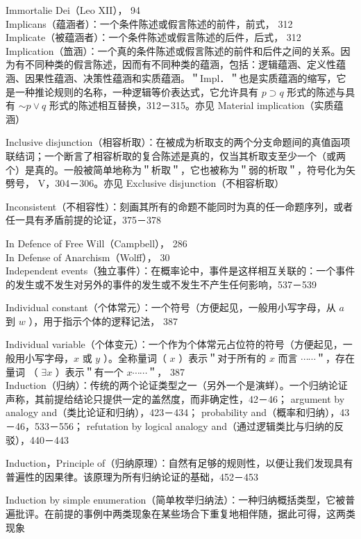 Immortalie Dei（Leo XII）， 94\\
Implicans（蕴涵者）：一个条件陈述或假言陈述的前件，前式， 312\\
Implicate（被蕴涵者）：一个条件陈述或假言陈述的后件，后式， 312\\
Implication（笽涵）：一个真的条件陈述或假言陈述的前件和后件之间的关系。因为有不同种类的假言陈述，因而有不同种类的蕴涵，包括：逻辑蕴涵、定义性蕴涵、因果性蕴涵、决策性蕴涵和实质蕴涵。＂Impl．＂也是实质蕴涵的缩写，它是一种推论规则的名称，一种逻辑等价表达式，它允许具有 $p \supset q$ 形式的陈述与具有 $\sim p \vee q$ 形式的陈述相互替换，312－315。亦见 Material implication（实质蕴涵）

Inclusive disjunction（相容析取）：在被成为析取支的两个分支命题间的真值函项联结词；一个断言了相容析取的复合陈述是真的，仅当其析取支至少一个（或两个）是真的。一般被简单地称为＂析取＂，它也被称为＂弱的析取＂，符号化为矢劈号， V，304－306。亦见 Exclusive disjunction（不相容析取）

Inconsistent（不相容性）：刻画其所有的命题不能同时为真的任一命题序列，或者任一具有矛盾前提的论证，375－378

In Defence of Free Will（Campbell）， 286\\
In Defense of Anarchism（Wolff）， 30\\
Independent events（独立事件）：在概率论中，事件是这样相互关联的：一个事件的发生或不发生对另外的事件的发生或不发生不产生任何影响，537－539

Individual constant（个体常元）：一个符号（方便起见，一般用小写字母，从 $a$ 到 $w$ ），用于指示个体的逻释记法， 387

Individual variable（个体变元）：一个作为个体常元占位符的符号（方便起见，一般用小写字母，$x$ 或 $y$ ）。全称量词（ $x$ ）表示＂对于所有的 $x$ 而言 $\cdots \cdots$＂，存在量词 （ $\exists x$ ）表示＂有一个 $x \cdots \cdots$＂， 387\\
Induction（归纳）：传统的两个论证类型之一（另外一个是演蛘）。一个归纳论证声称，其前提给结论只提供一定的盖然度，而非确定性，42－46； argument by analogy and（类比论证和归纳），423－434； probability and（概率和归纳），43－46，533－556； refutation by logical analogy and（通过逻辑类比与归纳的反驳），440－443

Induction，Principle of（归纳原理）：自然有足够的规则性，以便让我们发现具有普遍性的因果律。该原理为所有归纳论证的基础，452－453

Induction by simple enumeration（简单枚举归纳法）：一种归纳概括类型，它被普遍批评。在前提的事例中两类现象在某些场合下重复地相伴随，据此可得，这两类现象

